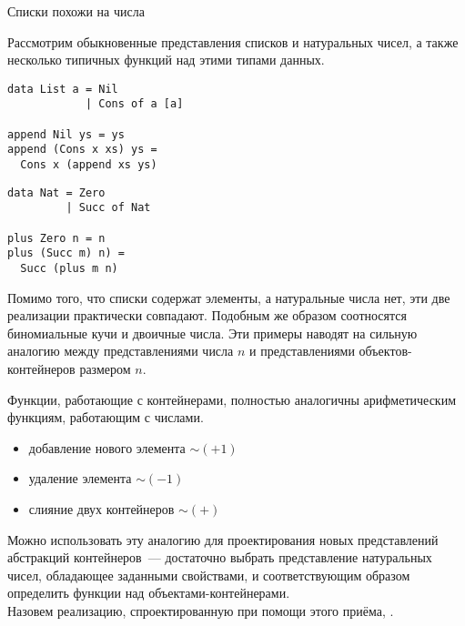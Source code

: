 \label{ch:9}

\begin{frame}[fragile]{Списки похожи на числа}

Рассмотрим обыкновенные представления списков и натуральных чисел, а
также несколько типичных функций над этими типами данных.\vspace{.5cm}

\begin{minipage}{.48\textwidth}
\begin{verbatim}
data List a = Nil
            | Cons of a [a]
  
append Nil ys = ys          
append (Cons x xs) ys =      
  Cons x (append xs ys)
\end{verbatim}
\end{minipage}
\begin{minipage}{.48\textwidth}
\begin{verbatim}
data Nat = Zero
         | Succ of Nat
 
plus Zero n = n
plus (Succ m) n) =
  Succ (plus m n)
\end{verbatim}
\end{minipage}\vspace{.5cm}

Помимо того, что списки содержат элементы, а натуральные числа нет,
эти две реализации практически совпадают. Подобным же образом
соотносятся биномиальные кучи и двоичные числа. Эти примеры наводят на
сильную аналогию между представлениями числа $n$ и представлениями
объектов-контейнеров размером $n$. 

\end{frame}

\begin{frame}[fragile]{}

Функции, работающие с контейнерами,
полностью аналогичны арифметическим функциям, работающим с
числами. 
\begin{itemize}
  \item  добавление нового элемента $\sim (+1)$ 
  \item удаление элемента $\sim (-1)$ 
  \item слияние двух контейнеров $\sim (+)$ 
\end{itemize}
 

Можно использовать эту аналогию для проектирования новых
представлений абстракций контейнеров~--- достаточно выбрать
представление натуральных чисел, обладающее заданными свойствами, и
соответствующим образом определить функции над
объектами-контейнерами. \\

Назовем реализацию, спроектированную при помощи
этого приёма, .

\end{frame}

